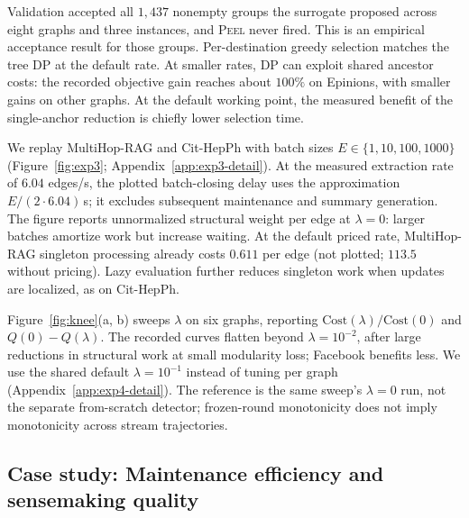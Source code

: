 



 Validation accepted all $1{,}437$ nonempty groups
the surrogate proposed across eight graphs and three instances, and
\textsc{Peel} never fired. This is an empirical acceptance result for those
groups. Per-destination greedy selection matches the tree DP at the
default rate. At smaller rates, DP can exploit shared ancestor costs:
the recorded objective gain reaches about $100\%$ on Epinions, with
smaller gains on other graphs. At the default working point, the measured
benefit of the single-anchor reduction is chiefly lower selection time.

% 

\label{sec:exp:batch}
We replay MultiHop-RAG and Cit-HepPh with batch sizes
$E\in\{1,10,100,1000\}$ (Figure~\ref{fig:exp3};
Appendix~\ref{app:exp3-detail}). At the measured extraction rate of $6.04$
edges/s, the plotted batch-closing delay uses the approximation
$E/(2\cdot6.04)$\,s; it excludes subsequent maintenance and summary generation.
The figure reports unnormalized structural weight per edge at $\lambda=0$:
larger batches amortize work but increase waiting. At the default priced
rate, MultiHop-RAG singleton processing already costs $0.611$ per edge
(not plotted; $113.5$ without pricing). Lazy evaluation further reduces
singleton work when updates are localized, as on Cit-HepPh.

Figure~\ref{fig:knee}(a, b) sweeps $\lambda$ on six graphs, reporting
$\mathrm{Cost}(\lambda)/\mathrm{Cost}(0)$ and $Q(0)-Q(\lambda)$.
The recorded curves flatten beyond $\lambda=10^{-2}$, after large
reductions in structural work at small modularity loss; Facebook benefits
less. We use the shared default $\lambda=10^{-1}$ instead of tuning per graph
(Appendix~\ref{app:exp4-detail}). The reference is the same sweep's
$\lambda=0$ run, not the separate from-scratch detector; frozen-round
monotonicity does not imply monotonicity across stream trajectories.

\subsection{Case study: Maintenance efficiency and sensemaking quality}
\label{sec:exp:e2e}

